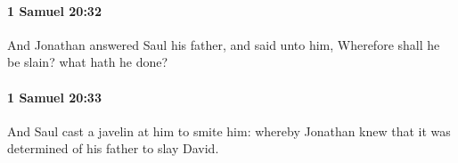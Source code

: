 		\paragraph{1 Samuel 20:32} %
			\label{1SAMUEL-20-32}

			And Jonathan answered Saul his father, and said unto him, Wherefore shall he be slain? what hath he done?


		\paragraph{1 Samuel 20:33} %
			\label{1SAMUEL-20-33}

			And Saul cast a javelin at him to smite him: whereby Jonathan knew that it was determined of his father to slay David.


